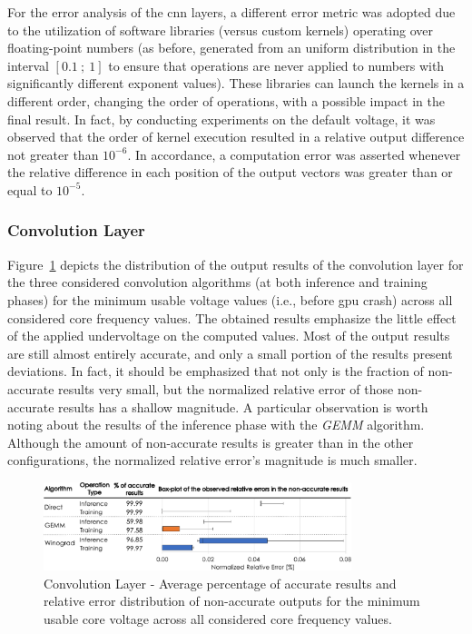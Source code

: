 For the error analysis of the \acrshort{cnn} layers, a different error metric was adopted due to the utilization of software libraries (versus custom kernels) operating over floating-point numbers (as before, generated from an uniform distribution in the interval $[0.1~;~1]$ to ensure that operations are never applied to numbers with significantly different exponent values). These libraries can launch the kernels in a different order, changing the order of operations, with a possible impact in the final result. In fact, by conducting experiments on the default voltage, it was observed that the order of kernel execution resulted in a relative output difference not greater than $10^{-6}$. In accordance, a computation error was asserted whenever the relative difference in each position of the output vectors was greater than or equal to  $10^{-5}$.

\subsubsection{Convolution Layer}

Figure~\ref{fig:Convolution_errors} depicts the distribution of the output results of the convolution layer for the three considered convolution algorithms (at both inference and training phases) for the minimum usable voltage values (i.e., before \acrshort{gpu} crash) across all considered core frequency values. The obtained results emphasize the little effect of the applied undervoltage on the computed values. Most of the output results are still almost entirely accurate, and only a small portion of the results present deviations. In fact, it should be emphasized that not only is the fraction of non-accurate results very small, but the normalized relative error of those non-accurate results has a shallow magnitude. A particular observation is worth noting about the results of the inference phase with the \textit{GEMM} algorithm. Although the amount of non-accurate results is greater than in the other configurations, the normalized relative error's magnitude is much smaller.

\begin{figure}[htbp]
    \centering
        \includegraphics[width=0.8\textwidth]{Figures/Application To Deep Learning/Convolution_Error_Distribution.pdf}
        \caption{Convolution Layer - Average percentage of accurate results and relative error distribution of non-accurate outputs for the minimum usable core voltage across all considered core frequency values.}
    \label{fig:Convolution_errors}
\end{figure}



